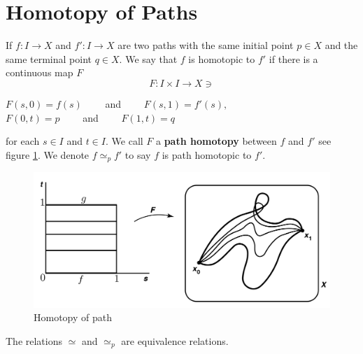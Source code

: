 \section{Homotopy of Paths}
\begin{definition}
If $f:I\rightarrow X$ and $f':I\rightarrow X$ are two paths with the same initial point $p\in X$ and the same terminal point $q\in X$. We say that $f$ is homotopic to $f'$ if there is a continuous map $F$
$$
F: I\times I\rightarrow X \ni
$$

\begin{center}
$F(s,0)=f(s) \qquad$ and $\qquad F(s,1)=f'(s),$\\
$F(0,t)=p \qquad$ and $\qquad F(1,t)=q $
\end{center}

for each $s\in I$ and $t\in I$. We call $F$ a \textbf{path homotopy} between $f$ and $f'$ see figure \ref{path}. We denote $f\simeq_p f'$ to say $f$ is path homotopic to $f'$.
\end{definition}
\begin{figure}[hbt!]
\centering
\includegraphics[width=.75\textwidth]{./images/def.jpg}
\caption{Homotopy of path}\label{path}
\end{figure}

\begin{prop}
The relations $\simeq$ and $\simeq_p$ are equivalence relations.
\end{prop}

